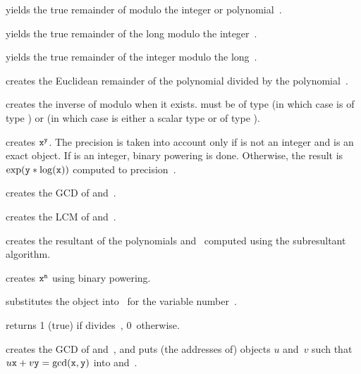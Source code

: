  yields the true remainder of 
modulo the integer or polynomial~.

 yields the true remainder of the
long  modulo the integer~.

 yields the true remainder of the
integer  modulo the long~.

 creates the Euclidean remainder of the
polynomial  divided by the polynomial~.

 creates the inverse of  modulo 
when it exists.  must be of type  (in which case  is of type ) or  (in which case  is either a scalar type or
of type ).

 creates ${\tt x}^{{\tt y}}$. The
precision  is taken into account only if  is not an integer
and  is an exact object. If  is an integer, binary powering
is done. Otherwise, the result is $\exp({\tt y}*\log({\tt x}))$ computed
to precision~.

 creates the GCD of  and~.

 creates the LCM of  and~.

 creates the resultant of the polynomials
 and~ computed using the subresultant algorithm.

 creates ${\tt x}^{{\tt n}}$ using
binary powering.

 substitutes the object 
into~ for the variable number~.

  returns 1 (true) if  divides~,
0~otherwise.

 creates the GCD of 
and~, and puts (the addresses of) objects $u$ and~$v$ such that
$u{\tt x}+v{\tt y}=\gcd({\tt x},{\tt y})$ into  and~.
\vfill\eject
